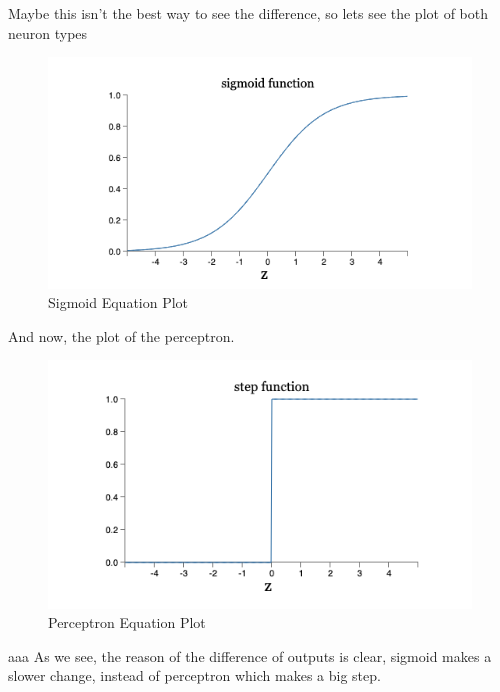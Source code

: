 \documentclass[12pt]{report}
\begin{document}
	Maybe this isn't the best way to see the difference, so lets see the plot of both neuron types
	\begin{figure}[h]
  \caption{Sigmoid Equation Plot}
  \centering
      \includegraphics[scale=0.5]{Resources/SigmoidPlot}
\end{figure}




And now, the plot of the perceptron.





\begin{figure}[h]
  \caption{Perceptron Equation Plot}
  \centering
      \includegraphics[scale=0.5]{Resources/PerceptronPlot}
\end{figure}
	
	
	    
	    
	   aaa
	As we see, the reason of  the difference of outputs is clear, sigmoid makes a slower change, instead of perceptron which makes a big step.
\end{document}
